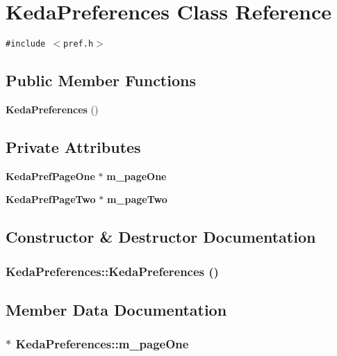 \section{Keda\-Preferences Class Reference}
\label{classKedaPreferences}
{\tt \#include $<$pref.h$>$}

\subsection*{Public Member Functions}
\begin{CompactItemize}
\item 
{\bf Keda\-Preferences} ()
\end{CompactItemize}
\subsection*{Private Attributes}
\begin{CompactItemize}
\item 
{\bf Keda\-Pref\-Page\-One} $\ast$ {\bf m\_\-page\-One}
\item 
{\bf Keda\-Pref\-Page\-Two} $\ast$ {\bf m\_\-page\-Two}
\end{CompactItemize}


\subsection{Constructor \& Destructor Documentation}
\subsubsection{\setlength{\rightskip}{0pt plus 5cm}Keda\-Preferences::Keda\-Preferences ()}\label{classKedaPreferences_7b3512f5482222b48329b3e6cd75a37f}




\subsection{Member Data Documentation}
\subsubsection{$\ast$ {\bf Keda\-Preferences::m\_\-page\-One}\hspace{0.3cm}{\tt  [private]}}\label{classKedaPreferences_c9bb9ddb693a045dec0166632154deca}


